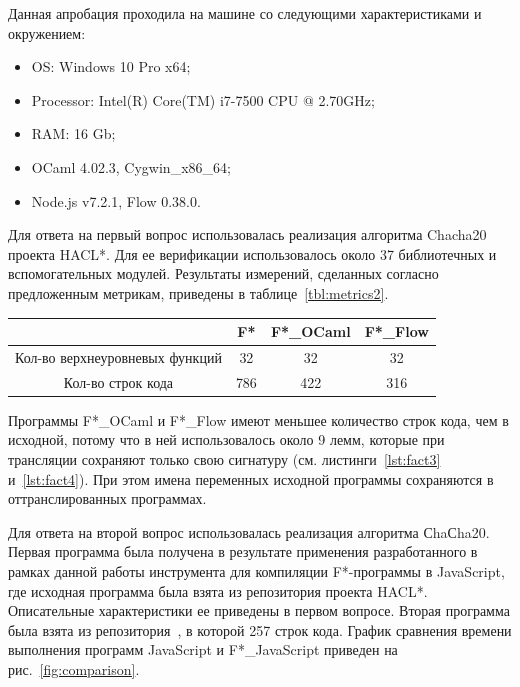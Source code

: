 Данная апробация проходила на машине со следующими характеристиками и окружением:

\begin{itemize}
\item OS: Windows 10 Pro x64;
\item Processor: Intel(R) Core(TM) i7-7500 CPU @ 2.70GHz;
\item RAM: 16 Gb;
\item OCaml 4.02.3, Cygwin\_x86\_64;
\item Node.js v7.2.1, Flow 0.38.0.
\end{itemize}

Для ответа на первый вопрос использовалась реализация алгоритма Chacha20~\cite{chacha} проекта HACL*. Для ее верификации использовалось около 37 библиотечных и вспомогательных модулей. Результаты измерений, сделанных согласно предложенным метрикам, приведены в таблице~\ref{tbl:metrics2}. 

\begin{center}  
\begin{tabular}{ | c | c | c | c | }
    \hline
      & F* & F*\_OCaml & F*\_Flow \\ \hline
    Кол-во верхнеуровневых функций & 32 & 32 & 32 \\ \hline
    Кол-во строк кода & 786 & 422 & 316 \\
    \hline
\end{tabular}
\captionsetup{type=table}
\label{tbl:metrics2} 
\end{center}

Программы F*\_OCaml и F*\_Flow  имеют меньшее количество строк кода, чем в исходной, потому что в ней использовалось около 9 лемм, которые при трансляции сохраняют только свою сигнатуру (см. листинги~\ref{lst:fact3} и~\ref{lst:fact4}). При этом имена переменных исходной программы сохраняются в оттранслированных программах.

Для ответа на второй вопрос использовалась реализация алгоритма СhaСha20. Первая программа была получена в результате применения разработанного в рамках данной работы инструмента для компиляции F*-программы в JavaScript, где исходная программа была взята из репозитория проекта HACL*. Описательные характеристики ее приведены в первом вопросе. Вторая программа была взята из репозитория~\cite{chachajs}, в которой 257 строк кода. График сравнения времени выполнения программ JavaScript и F*\_JavaScript приведен на рис.~\ref{fig:comparison}.

